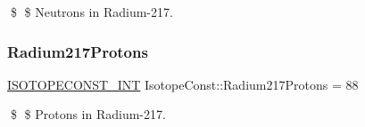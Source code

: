 \$ \$ Neutrons in Radium-\/217. \mbox{\label{group___isotope_const-_radium-_ra217_gae8fcdace15578f8651c018366b4a1bf6}} 
\subsubsection{\texorpdfstring{Radium217\+Protons}{Radium217Protons}}
{\footnotesize\ttfamily \mbox{\hyperlink{group___isotope_const-_macros_ga5f18360b3e99483a35c32d789e62621c}{I\+S\+O\+T\+O\+P\+E\+C\+O\+N\+S\+T\+\_\+\+I\+NT}} Isotope\+Const\+::\+Radium217\+Protons = 88}

\$ \$ Protons in Radium-\/217. 